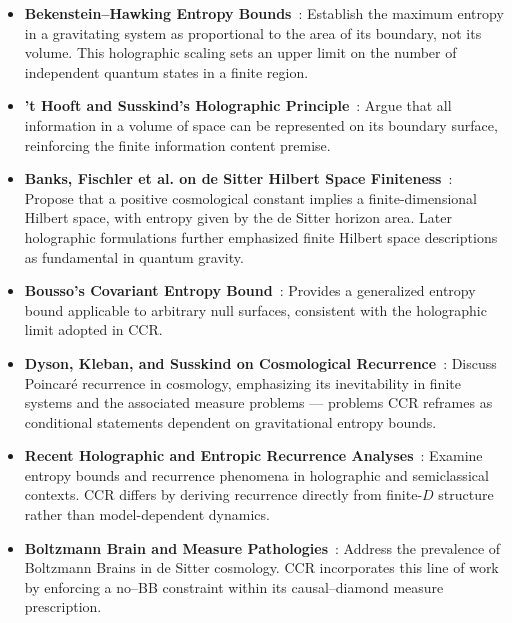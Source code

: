 \documentclass[12pt]{article}
\theoremstyle{remark}
\begin{document}
\begin{itemize}[leftmargin=1.2em]
    \item \textbf{Bekenstein--Hawking Entropy Bounds}~\cite{Bekenstein1973,Hawking1975}: 
    Establish the maximum entropy in a gravitating system as proportional to the area of its boundary, not its volume. This holographic scaling sets an upper limit on the number of independent quantum states in a finite region.

    \item \textbf{'t Hooft and Susskind's Holographic Principle}~\cite{tHooft1993,Susskind1995}:  
    Argue that all information in a volume of space can be represented on its boundary surface, reinforcing the finite information content premise.

    \item \textbf{Banks, Fischler et al. on de Sitter Hilbert Space Finiteness}~\cite{BanksFischler2001,BanksFischler2003,BanksFischler2021}:  
    Propose that a positive cosmological constant implies a finite-dimensional Hilbert space, with entropy given by the de Sitter horizon area. Later holographic formulations further emphasized finite Hilbert space descriptions as fundamental in quantum gravity.

    \item \textbf{Bousso’s Covariant Entropy Bound}~\cite{Bousso1999}:  
    Provides a generalized entropy bound applicable to arbitrary null surfaces, consistent with the holographic limit adopted in CCR.

    \item \textbf{Dyson, Kleban, and Susskind on Cosmological Recurrence}~\cite{DysonKlebanSusskind2002}:  
    Discuss Poincaré recurrence in cosmology, emphasizing its inevitability in finite systems and the associated measure problems — problems CCR reframes as conditional statements dependent on gravitational entropy bounds.

    \item \textbf{Recent Holographic and Entropic Recurrence Analyses}~\cite{Bao2022}:  
    Examine entropy bounds and recurrence phenomena in holographic and semiclassical contexts. CCR differs by deriving recurrence directly from finite-$D$ structure rather than model-dependent dynamics.

    \item \textbf{Boltzmann Brain and Measure Pathologies}~\cite{BoddyCarroll2018}:  
    Address the prevalence of Boltzmann Brains in de Sitter cosmology. CCR incorporates this line of work by enforcing a no–BB constraint within its causal–diamond measure prescription.
\end{itemize}
\end{document}
